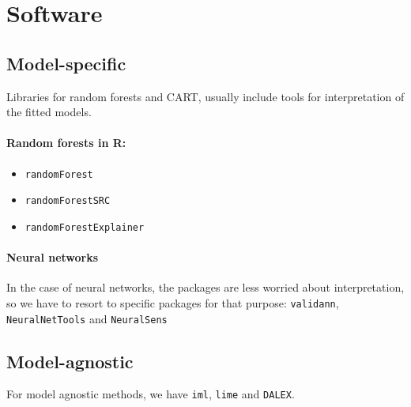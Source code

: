\section{Software}

\subsection{Model-specific}

Libraries for random forests and CART, usually include tools for interpretation
of the fitted models.

\paragraph{Random forests in R:}
\begin{itemize}
    \item \texttt{randomForest}
    \item \texttt{randomForestSRC}
    \item \texttt{randomForestExplainer}
\end{itemize}

\paragraph{Neural networks} In the case of neural networks, the packages are less worried about
interpretation, so we have to resort to specific packages for that purpose:
\texttt{validann}, \texttt{NeuralNetTools} and \texttt{NeuralSens}

\subsection{Model-agnostic}

For model agnostic methods, we have \texttt{iml}, \texttt{lime} and
\texttt{DALEX}.
